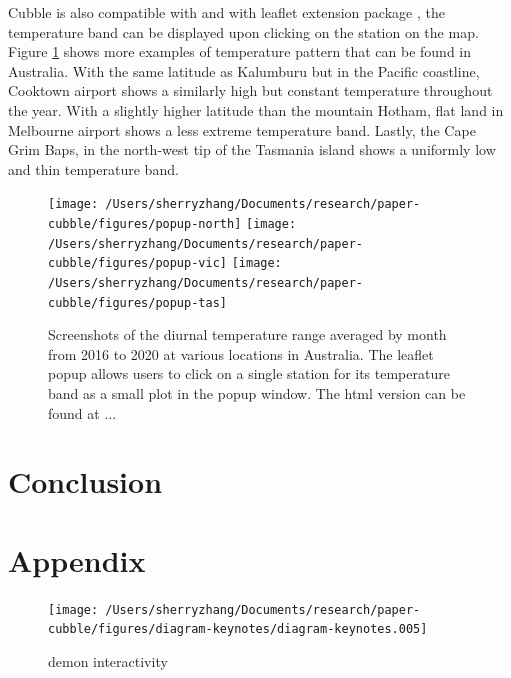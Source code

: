 \documentclass[
]{jss}
\begin{document}
Cubble is also compatible with  and with leaflet extension
package , the temperature band can be displayed upon
clicking on the station on the map. Figure \ref{fig:interactive-popup}
shows more examples of temperature pattern that can be found in
Australia. With the same latitude as Kalumburu but in the Pacific
coastline, Cooktown airport shows a similarly high but constant
temperature throughout the year. With a slightly higher latitude than
the mountain Hotham, flat land in Melbourne airport shows a less extreme
temperature band. Lastly, the Cape Grim Baps, in the north-west tip of
the Tasmania island shows a uniformly low and thin temperature band.

\begin{CodeChunk}
\begin{figure}

{\centering \texttt{[image: /Users/sherryzhang/Documents/research/paper-cubble/figures/popup-north]} \texttt{[image: /Users/sherryzhang/Documents/research/paper-cubble/figures/popup-vic]} \texttt{[image: /Users/sherryzhang/Documents/research/paper-cubble/figures/popup-tas]} 

}

\caption[Screenshots of the diurnal temperature range averaged by month from 2016 to 2020 at various locations in Australia]{Screenshots of the diurnal temperature range averaged by month from 2016 to 2020 at various locations in Australia. The leaflet popup allows users to click on a single station for its temperature band as a small plot in the popup window. The html version can be found at ...}\label{fig:interactive-popup}
\end{figure}
\end{CodeChunk}

\hypertarget{conclusion}{%
\section{Conclusion}\label{conclusion}}

\hypertarget{appendix}{%
\section{Appendix}\label{appendix}}

\begin{CodeChunk}
\begin{figure}

{\centering \texttt{[image: /Users/sherryzhang/Documents/research/paper-cubble/figures/diagram-keynotes/diagram-keynotes.005]} 

}

\caption[demon interactivity]{demon interactivity}\label{fig:illu-interactive-2}
\end{figure}
\end{CodeChunk}

\newpage


\end{document}
